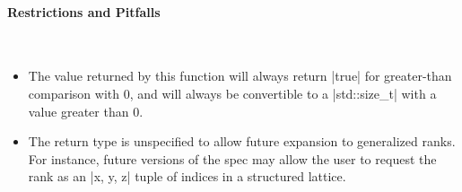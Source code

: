 \paragraph{Restrictions and Pitfalls}\mbox{} \\
\begin{itemize}
  \item The value returned by this function will always return |true|
  for greater-than comparison with 0, and will always be convertible to a
  |std::size_t| with a value greater than 0.
  \item The return type is unspecified to allow future expansion to generalized
  ranks.  For instance, future versions of the spec may allow the user to
  request the rank as an |{x, y, z}| tuple of indices in a structured
  lattice.
\end{itemize}

